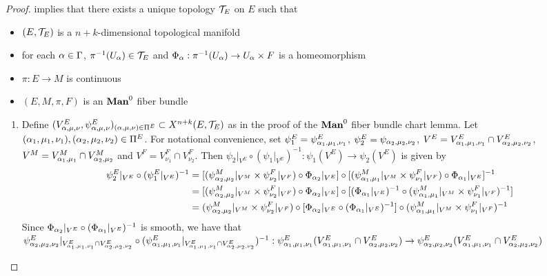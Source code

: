 \documentclass{book}
\begin{document}
	\begin{proof}
		 implies that there exists a unique topology $\mathcal{T}_E$ on $E$ such that 
		\begin{itemize}
			\item $(E, \mathcal{T}_E)$ is a $n+k$-dimensional topological manifold 
			\item for each $\alpha \in \Gamma$, $ \pi^{-1}(U_{\alpha}) \in \mathcal{T}_E$ and $\Phi_{\alpha}: \pi^{-1}(U_{\alpha}) \rightarrow U_{\alpha} \times F$ is a homeomorphism
			\item $\pi: E \rightarrow M$ is continuous
			\item $(E, M, \pi, F)$ is an $\Man0$ fiber bundle
		\end{itemize}
		\begin{enumerate}
			\item Define $(V^E_{\alpha, \mu, \nu}, \psi^E_{\alpha, \mu, \nu})_{(\alpha, \mu, \nu) \in \Pi^E} \subset X^{n+k}(E, \mathcal{T}_E)$ as in the proof of the $\Man0$ fiber bundle chart lemma. Let $(\alpha_1, \mu_1, \nu_1), (\alpha_2, \mu_2, \nu_2) \in \Pi^E$. For notational convenience, set $\psi^E_1 = \psi^E_{\alpha_1, \mu_1, \nu_1}$, $\psi^E_2 = \psi_{\alpha_2, \mu_2, \nu_2}$, $V^E = V^E_{\alpha_1, \mu_1, \nu_1} \cap V^E_{\alpha_2, \mu_2, \nu_2}$, $V^M = V_{\alpha_1, \mu_1}^M \cap V^M_{\alpha_2, \mu_2}$ and $V^F = V^F_{\nu_1} \cap V^F_{\nu_2}$. Then $\psi_2|_{V^E} \circ (\psi_1|_{V^E})^{-1}: \psi_1(V^E) \rightarrow \psi_2(V^E)$ is given by
			\begin{align*}
				\psi^E_2|_{V^E} \circ (\psi^E_1|_{V^E})^{-1}
				& = [(\psi_{\alpha_2, \mu_2}^M|_{V^M} \times \psi_{\nu_2}^F|_{V^F}) \circ \Phi_{\alpha_2}|_{V^E}] \circ [(\psi_{\alpha_1, \mu_1}^M|_{V^M} \times \psi_{\nu_1}^F|_{V^F}) \circ \Phi_{\alpha_1}|_{V^E}]^{-1} \\
				& = [(\psi_{\alpha_2, \mu_2}^M|_{V^M} \times \psi_{\nu_2}^F|_{V^F}) \circ \Phi_{\alpha_2}|_{V^E}] \circ [(\Phi_{\alpha_1}|_{V^E})^{-1} \circ (\psi_{\alpha_1, \mu_1}^M|_{V^M} \times \psi_{\nu_1}^F|_{V^F})^{-1}] \\
				& = (\psi_{\alpha_2, \mu_2}^M|_{V^M} \times \psi_{\nu_2}^F|_{V^F}) \circ [\Phi_{\alpha_2}|_{V^E} \circ (\Phi_{\alpha_1}|_{V^E})^{-1}] \circ (\psi_{\alpha_1, \mu_1}^M|_{V^M} \times \psi_{\nu_1}^F|_{V^F})^{-1}
			\end{align*}
			Since $\Phi_{\alpha_2}|_{V^E} \circ (\Phi_{\alpha_1}|_{V^E})^{-1}$ is smooth, we have that 
			$\psi^E_{\alpha_2, \mu_2, \nu_2}|_{V^E_{\alpha_1, \mu_1, \nu_1} \cap V^E_{\alpha_2, \mu_2, \nu_2}} \circ (\psi^E_{\alpha_1, \mu_1, \nu_1}|_{V^E_{\alpha_1, \mu_1, \nu_1} \cap V^E_{\alpha_2, \mu_2, \nu_2}})^{-1}: \psi^E_{\alpha_1, \mu_1, \nu_1}(V^E_{\alpha_1, \mu_1, \nu_1} \cap V^E_{\alpha_2, \mu_2, \nu_2}) \rightarrow \psi^E_{\alpha_2, \mu_2, \nu_2}(V^E_{\alpha_1, \mu_1, \nu_1} \cap V^E_{\alpha_2, \mu_2, \nu_2})$

\end{enumerate}
\end{proof}
\end{document}
